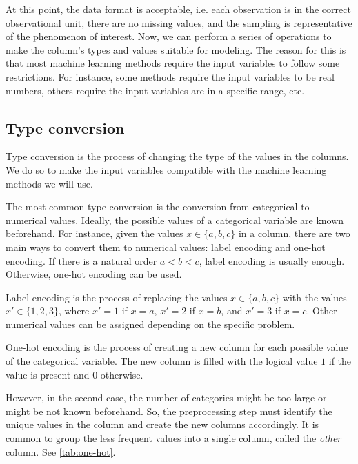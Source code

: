 At this point, the data format is acceptable, i.e. each observation is in the correct
observational unit, there are no missing values, and the sampling is representative of the
phenomenon of interest.  Now, we can perform a series of operations to make the
column's types and values suitable for modeling.  The reason for this is that most
machine learning methods require the input variables to follow some restrictions.  For
instance, some methods require the input variables to be real numbers, others require the
input variables are in a specific range, etc.

\subsection{Type conversion}

Type conversion is the process of changing the type of the values in the columns.  We do
so to make the input variables compatible with the machine learning methods we will use.

The most common type conversion is the conversion from categorical to numerical values.
Ideally, the possible values of a categorical variable are known beforehand.
For instance, given the values $x \in \{a, b, c\}$ in a column, there are two main ways to
convert them to numerical values: label encoding and one-hot encoding.  If there is a
natural order $a < b < c$, label encoding is usually enough.  Otherwise, one-hot encoding
can be used.

Label encoding is the process of replacing the values $x \in \{a, b, c\}$ with the values
$x' \in \{1, 2, 3\}$, where $x' = 1$ if $x = a$, $x' = 2$ if $x = b$, and $x' = 3$ if
$x = c$.  Other numerical values can be assigned depending on the specific problem.

One-hot encoding is the process of creating a new column for each possible value
of the categorical variable.  The new column is filled with the logical value $1$ if the
value is present and $0$ otherwise.

However, in the second case, the number of categories might be too large or might be not
known beforehand.  So, the preprocessing step must identify the unique values in the
column and create the new columns accordingly.  It is common to group the less frequent
values into a single column, called the \emph{other} column.  See \cref{tab:one-hot}.

